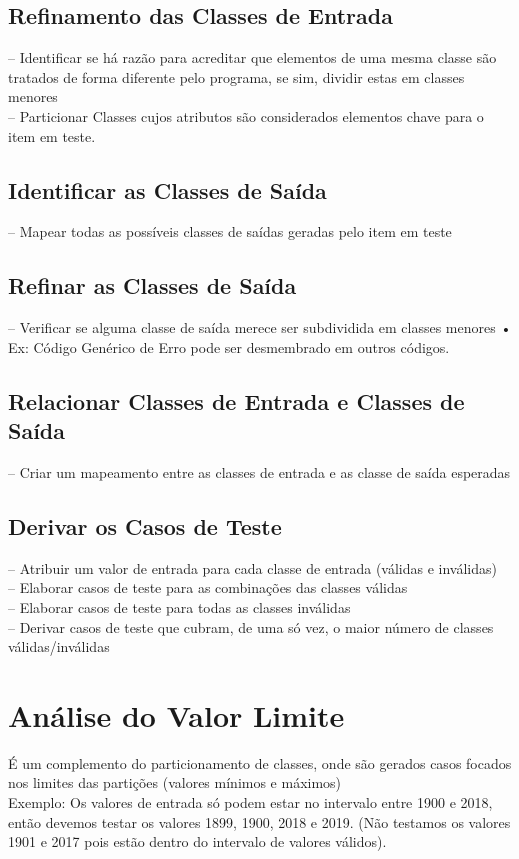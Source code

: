 \documentclass[12pt]{article}%
\begin{document}
\subsection{Refinamento das Classes de Entrada}
– Identificar se há razão para acreditar que elementos de uma mesma classe são tratados de forma diferente pelo
programa, se sim, dividir estas em classes menores \\
– Particionar Classes cujos atributos são considerados elementos chave para o item em teste.
\subsection{Identificar as Classes de Saída}
– Mapear todas as possíveis classes de saídas geradas pelo item em teste

\subsection{Refinar as Classes de Saída}
– Verificar se alguma classe de saída merece ser subdividida em classes menores
• Ex: Código Genérico de Erro pode ser desmembrado em outros códigos.
\subsection{Relacionar Classes de Entrada e Classes de Saída}
– Criar um mapeamento entre as classes de entrada e as classe de saída esperadas
\subsection{Derivar os Casos de Teste }
– Atribuir um valor de entrada para cada classe de entrada (válidas e inválidas) \\
– Elaborar casos de teste para as combinações das classes válidas \\
– Elaborar casos de teste para todas as classes inválidas \\
– Derivar casos de teste que cubram, de uma só vez, o maior número de classes válidas/inválidas



\section{Análise do Valor Limite}
É um complemento do particionamento de classes, onde são gerados casos focados nos limites das partições (valores mínimos e máximos)\\
Exemplo: Os valores de entrada só podem estar no intervalo entre 1900 e 2018, então devemos testar os valores 1899, 1900, 2018 e 2019. (Não testamos os valores 1901 e 2017 pois estão dentro do intervalo de valores válidos).
\end{document}
